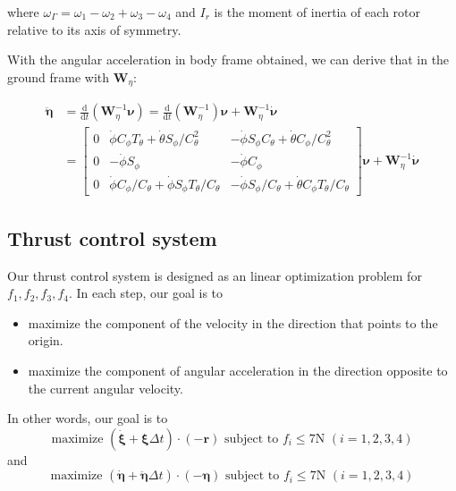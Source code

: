 where $\omega_{\Gamma}=\omega_{1}-\omega_{2}+\omega_{3}-\omega_{4}$ and $I_r$ is the moment of inertia of each rotor relative to its axis of symmetry. 

With the angular acceleration in body frame obtained, we can derive that in the ground frame with $\boldsymbol{W}_{\eta}$:

\begin{equation}
\label{groundAngularAcceleration}
\begin{aligned}
\ddot{\boldsymbol{\eta}} &=\frac{\mathrm{d}}{\mathrm{d} t}\left(\boldsymbol{W}_{\eta}^{-1} \boldsymbol{\nu}\right)=\frac{\mathrm{d}}{\mathrm{d} t}\left(\boldsymbol{W}_{\eta}^{-1}\right) \boldsymbol{\nu}+\boldsymbol{W}_{\eta}^{-1} \dot{\boldsymbol{\nu}} \\
&=\left[\begin{array}{ccc}
0 & \dot{\phi} C_{\phi} T_{\theta}+\dot{\theta} S_{\phi} / C_{\theta}^{2} & -\dot{\phi} S_{\phi} C_{\theta}+\dot{\theta} C_{\phi} / C_{\theta}^{2} \\
0 & -\dot{\phi} S_{\phi} & -\dot{\phi} C_{\phi} \\
0 & \dot{\phi} C_{\phi} / C_{\theta}+\dot{\phi} S_{\phi} T_{\theta} / C_{\theta} & -\dot{\phi} S_{\phi} / C_{\theta}+\dot{\theta} C_{\phi} T_{\theta} / C_{\theta}
\end{array}\right] \boldsymbol{\nu}+\boldsymbol{W}_{\eta}^{-1} \dot{\boldsymbol{\nu}}
\end{aligned}
\end{equation}

\subsection{Thrust control system}
\label{Sec:Flight control}
Our thrust control system is designed as an linear optimization problem for $f_1, f_2, f_3, f_4$. In each step, our goal is to
\begin{itemize}
    \item maximize the component of the velocity in the direction that points to the origin.
    \item maximize the component of angular acceleration in the direction opposite to the current angular velocity.
\end{itemize}

In other words, our goal is to
    \begin{equation}
        \text{maximize  } (\dot{\boldsymbol{\xi}} + \boldsymbol{\xi} \Delta t) \cdot (- \boldsymbol{r}) \text{  subject to  } f_i \leq 7 \text{N } (i= 1, 2, 3, 4)
    \end{equation}
    and 
    \begin{equation}
        \text{maximize  } (\boldsymbol{\dot{\boldsymbol{\eta}}} + \ddot{\boldsymbol{\eta}} \Delta t) \cdot (- \boldsymbol{\eta})
        \text {  subject to } f_i \leq 7 \text{N } (i = 1, 2, 3, 4)
    \end{equation}
    
